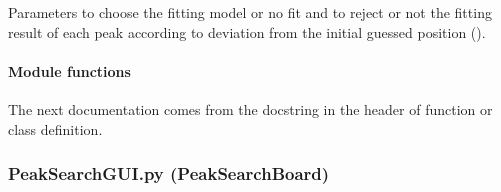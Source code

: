 \documentclass[letterpaper,10pt,english]{sphinxmanual}
\begin{document}
\noindent{}

Parameters to choose the fitting model or no fit and to reject or not the fitting result of each peak according to deviation from the initial guessed position ().

\noindent{}

\noindent{}


\paragraph{Module functions}
\label{\detokenize{PeakSearchGUI:module-functions}}
The next documentation comes from the docstring in the header of function or class definition.


\subsubsection{PeakSearchGUI.py (PeakSearchBoard)}
\label{\detokenize{PeakSearchGUI:peaksearchgui-py-peaksearchboard}}\label{\detokenize{PeakSearchGUI:module-LaueTools.GUI.PeakSearchGUI}}
\end{document}
